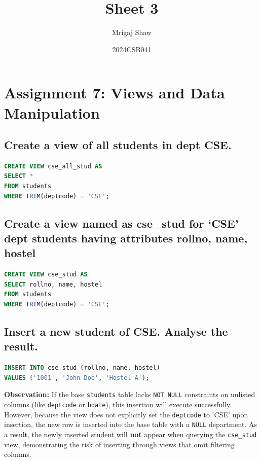 \documentclass[11pt, a4paper]{article}
\title{Sheet 3}
\author{Mrigaj Shaw}
\date{2024CSB041}
\begin{document}
\maketitle

\section{Assignment 7: Views and Data Manipulation}

\subsection*{Create a view of all students in dept CSE.}
\begin{lstlisting}[language=SQL]
CREATE VIEW cse_all_stud AS
SELECT * 
FROM students 
WHERE TRIM(deptcode) = 'CSE';
\end{lstlisting}
\vspace{0.3cm}

\subsection*{Create a view named as cse\_stud for `CSE' dept students having attributes rollno, name, hostel}
\begin{lstlisting}[language=SQL]
CREATE VIEW cse_stud AS
SELECT rollno, name, hostel 
FROM students 
WHERE TRIM(deptcode) = 'CSE';
\end{lstlisting}
\vspace{0.3cm}

\subsection*{Insert a new student of CSE. Analyse the result.}
\begin{lstlisting}[language=SQL]
INSERT INTO cse_stud (rollno, name, hostel) 
VALUES ('1001', 'John Doe', 'Hostel A');
\end{lstlisting}
\vspace{0.2cm}
\textbf{Observation:} If the base \texttt{students} table lacks \texttt{NOT NULL} constraints on unlisted columns (like \texttt{deptcode} or \texttt{bdate}), this insertion will execute successfully. However, because the view does not explicitly set the \texttt{deptcode} to 'CSE' upon insertion, the new row is inserted into the base table with a \texttt{NULL} department. As a result, the newly inserted student will \textbf{not} appear when querying the \texttt{cse\_stud} view, demonstrating the risk of inserting through views that omit filtering columns.
\vspace{0.3cm}
\end{document}
